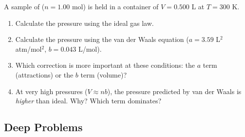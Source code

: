 \documentclass[12pt, a4paper]{book}
\begin{document}
\begin{problembox}
\begin{enumerate}[label=\textbf{\arabic*.}]
    A sample of  ($n = 1.00$ mol) is held in a
    container of $V = 0.500$ L at $T = 300$ K.
    \begin{enumerate}[label=(\alph*)]
      \item Calculate the pressure using the ideal gas law.
      \item Calculate the pressure using the van der Waals
            equation ($a = 3.59$ L$^2$ atm/mol$^2$,
            $b = 0.043$ L/mol).
      \item Which correction is more important at these
            conditions: the $a$ term (attractions) or the
            $b$ term (volume)?
      \item At very high pressures ($V \approx nb$), the
            pressure predicted by van der Waals is
            \emph{higher} than ideal.
            Why? Which term dominates?
    \end{enumerate}
\end{enumerate}
\end{problembox}

\subsection*{Deep Problems}
\end{document}
